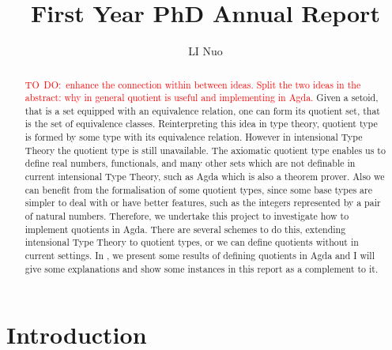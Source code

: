 \documentclass[envcountsame]{llncs}
\title{First Year PhD Annual Report}
\author{LI Nuo}
\institute{University of Nottingham}
\newcommand{\todo}[1]{\textcolor{red}{TO~DO:~#1}}
\newcommand{\itt}{intensional Type Theory}
\begin{document}
\maketitle

\newpage

\tableofcontents

\newpage 

\begin{abstract}
\todo{enhance the connection within between ideas. Split the two ideas in the abstract: why in general quotient is useful and implementing in Agda.}
Given a setoid, that is a set equipped with an equivalence relation, one can form its quotient set, that is the set of equivalence classes. %
Reinterpreting this idea in type theory, quotient type is formed by some type with its equivalence relation. However in \itt{}  the quotient type is still unavailable. The axiomatic quotient type enables us to define real numbers, functionals, and many other sets which are not definable in current \itt,  such as Agda which is also a theorem prover. Also we can benefit from the formalisation of some quotient types, since some base types are simpler to deal with or have better features, such as the integers represented by a pair of natural numbers.  Therefore, we undertake this project to investigate how to implement quotients in Agda. There are several schemes to do this, extending intensional Type Theory to quotient types, or we can define quotients without in current settings. In  \cite{aan}, we present some results of defining quotients in Agda and I will
give some explanations  and show some instances in this report as a complement to it.

\end{abstract}


\section{Introduction}
\end{document}
